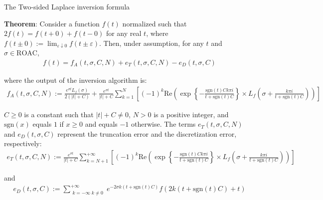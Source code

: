 \documentclass{beamer}
\begin{document}
\begin{frame}{The Two-sided Laplace inversion formula}


    {\footnotesize \scriptsize
    \par \textbf{Theorem}: Consider a function \( f(t) \) normalized such that \( 2f(t) = f(t + 0) + f(t - 0) \) 
    for any real \( t \), where \( f(t \pm 0) := \lim_{\varepsilon \downarrow 0} f(t \pm \varepsilon) \). 
    Then, under assumption, for any \( t \) and \( \sigma \in \text{ROAC} \),
    \begin{align*}
        f(t) = f_A(t, \sigma, C, N) + e_T(t, \sigma, C, N) - e_D(t, \sigma, C)
    \end{align*}
    \par where the output of the inversion algorithm is:
    {\footnotesize \tiny
    \begin{align*}
        f_A(t, \sigma, C, N) := \frac{e^{\sigma t} L_f(\sigma)}{2(|t| + C)} + \frac{e^{\sigma t}}{|t| + C} 
        \sum_{k=1}^{N} \left[ (-1)^k \text{Re} \left( \exp \left\{ -\frac{\text{sgn}(t)C k \pi i}{t 
        + \text{sgn}(t)C} \right\} \times L_f \left( \sigma + \frac{k \pi i}{t + \text{sgn}(t)C} \right) \right) \right]
    \end{align*}
    }
    \par  \pause \( C \geq 0 \) is a constant such that \( |t| + C \neq 0 \), \( N > 0 \) is a positive integer, and \(\text{sgn}(x)\) equals \( 1 \) if \( x \geq 0 \) and equals \(-1\) otherwise.
     The terms \( e_T(t, \sigma, C, N) \) and \( e_D(t, \sigma, C) \) represent the truncation error and the discretization error, respectively:
     {\footnotesize \tiny
    \begin{align*}
       e_T(t, \sigma, C, N) := \frac{e^{\sigma t}}{|t| + C} 
       \sum_{k=N+1}^{+\infty} \left[ (-1)^k \text{Re} \left( \exp \left\{ -\frac{\text{sgn}(t)C k \pi i}{t + \text{sgn}(t)C} \right\} 
       \times L_f \left( \sigma + \frac{k \pi i}{t + \text{sgn}(t)C} \right) \right) \right]    
    \end{align*}
    }
    \par and 
     {\footnotesize \tiny
    \begin{align*}
      e_D(t, \sigma, C) := \sum_{\substack{k=-\infty \; k \neq 0}}^{+\infty} e^{-2\sigma k (t + \text{sgn}(t)C)} f(2k(t + \text{sgn}(t)C) + t)
    \end{align*}
    }
    }
    
\end{frame}
\end{document}
